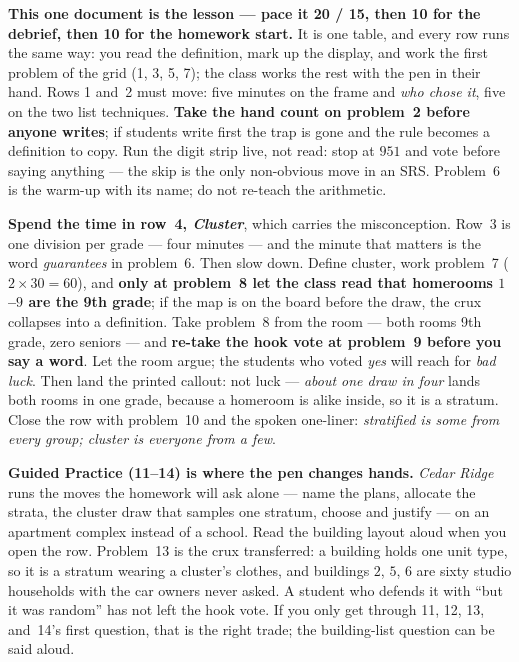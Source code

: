 \documentclass[10pt]{article}
\begin{document}
\begin{teachernote}
\textbf{This one document is the lesson --- pace it 20 / 15, then 10 for the debrief, then 10
for the homework start.} It is one table, and every row runs the same way: you read the
definition, mark up the display, and work the first problem of the grid (1, 3, 5, 7); the
class works the rest with the pen in their hand. Rows 1 and~2 must move: five minutes on the
frame and \emph{who chose it}, five on the two list techniques. \textbf{Take the hand count on
problem~2 before anyone writes}; if students write first the trap is gone and the rule becomes
a definition to copy. Run the digit strip live, not read: stop at $951$ and
vote before saying anything --- the skip is the only non-obvious move in an SRS. Problem~6 is
the warm-up with its name; do not re-teach the arithmetic.

\textbf{Spend the time in row~4, \emph{Cluster}}, which carries the misconception. Row~3 is
one division per grade --- four minutes --- and the minute that matters is the word
\emph{guarantees} in problem~6. Then slow down. Define cluster, work problem~7 ($2 \times 30 =
60$), and \textbf{only at problem~8 let the class read that homerooms $1$--$9$ are the 9th
grade}; if the map is on the board before the draw, the crux collapses into a definition. Take
problem~8 from the room --- both rooms 9th grade, zero seniors --- and \textbf{re-take the
hook vote at problem~9 before you say a word}. Let the room
argue; the students who voted \emph{yes} will reach for \emph{bad luck}. Then land the printed
callout: not luck --- \emph{about one draw in four} lands both rooms in one grade, because a
homeroom is alike inside, so it is a stratum. Close the row with problem~10 and the
spoken one-liner: \emph{stratified is some from every group; cluster is everyone from a few}.

\textbf{Guided Practice (11--14) is where the pen changes hands.} \emph{Cedar Ridge} runs the
moves the homework will ask alone --- name the plans, allocate the strata, the cluster draw
that samples one stratum, choose and justify --- on an apartment complex instead of a school.
Read the building layout aloud when you open the row. Problem~13 is the crux transferred: a
building holds one unit type, so it is a stratum wearing a cluster's clothes, and buildings
$2$, $5$, $6$ are sixty studio households with the car owners never asked. A student who
defends it with ``but it was random'' has not left the hook vote. If you only get through 11,
12, 13, and~14's first question, that is the right trade; the building-list question can be
said aloud.


\end{teachernote}
\end{document}
